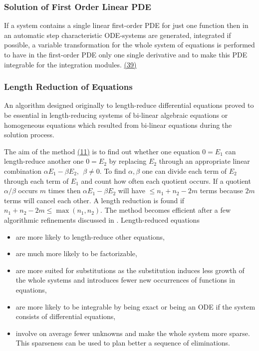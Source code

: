 \subsubsection{Solution of First Order Linear PDE}

If a system contains a single linear first-order PDE for just one
function then in an automatic step characteristic ODE-systems are
generated, integrated if possible, a variable transformation for the
whole system of equations is performed to have in the first-order PDE
only one single derivative and to make this PDE integrable for the
integration modules.  \hyperref[crack-m_39]{(39)}

\subsubsection{Length Reduction of Equations}

An algorithm designed originally to length-reduce differential
equations proved to be essential in length-reducing systems of
bi-linear algebraic equations or homogeneous equations which resulted
from bi-linear equations during the solution process.

The aim of the method \hyperref[crack-m_11]{(11)} is to find out
whether one equation $0=E_1$ can length-reduce another one $0=E_2$ by
replacing $E_2$ through an appropriate linear combination $\alpha E_1
- \beta E_2,\ \ \beta \neq 0$.  To find $\alpha, \beta$ one can divide
each term of $E_2$ through each term of $E_1$ and count how often each
quotient occurs.  If a quotient $\alpha/\beta$ occurs $m$ times then
$\alpha E_1 - \beta E_2$ will have $\leq n_1+n_2-2m$ terms because
$2m$ terms will cancel each other.  A length reduction is found if
$n_1+n_2-2m\leq\max(n_1,n_2)$.  The method becomes efficient after a
few algorithmic refinements discussed in \cite{Wolf:2002}.
Length-reduced equations
\begin{itemize}
\item are more likely to length-reduce other equations,
\item are much more likely to be factorizable,
\item are more suited for substitutions as the substitution induces
  less growth of the whole systems and introduces fewer new occurrences
  of functions in equations,
\item are more likely to be integrable by being exact or being an ODE
  if the system consists of differential equations,
\item involve on average fewer unknowns and make the whole system more
  sparse.  This sparseness can be used to plan better a sequence of
  eliminations.
\end{itemize}

